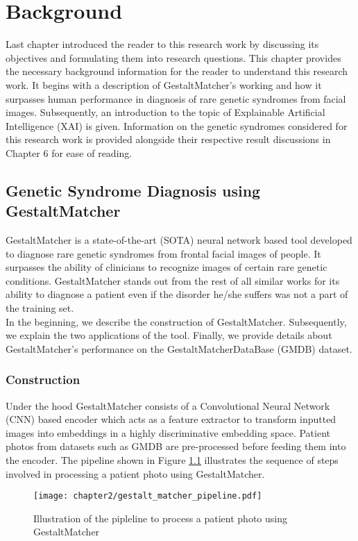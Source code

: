 \documentclass[../report.tex]{subfiles}
\begin{document}
    \chapter{Background}\label{chap_background}
	Last chapter introduced the reader to this research work by discussing its objectives and formulating them into research questions. This chapter provides the necessary background information for the reader to understand this research work. It begins with a description of GestaltMatcher's working and how it surpasses human performance in diagnosis of rare genetic syndromes from facial images. Subsequently, an introduction to the topic of Explainable Artificial Intelligence (XAI) is given. Information on the genetic syndromes considered for this research work is provided alongside their respective result discussions in Chapter 6 for ease of reading. 
    \section{Genetic Syndrome Diagnosis using GestaltMatcher}
    GestaltMatcher is a state-of-the-art (SOTA) neural network based tool developed to diagnose rare genetic syndromes from frontal facial images of people. It surpasses the ability of clinicians to recognize images of certain rare genetic conditions. GestaltMatcher stands out from the rest of all similar works for its ability to diagnose a patient even if the disorder he/she suffers was not a part of the training set.\\ 
    In the beginning, we describe the construction of GestaltMatcher. Subsequently, we explain the two applications of the tool. Finally, we provide details about GestaltMatcher's performance on the GestaltMatcherDataBase (GMDB) dataset.     
    \subsection{Construction}
    Under the hood GestaltMatcher consists of a  Convolutional Neural Network (CNN) based encoder which acts as a feature extractor
    to transform inputted images into embeddings in a highly discriminative embedding space. Patient photos from datasets such as GMDB are pre-processed before feeding them into the encoder.
    The pipeline shown in Figure \ref{fig_gm_pipeline_ch2} illustrates the sequence of steps involved in processing a patient photo using GestaltMatcher.
    \begin{figure}[ht]
    	\hspace*{-0.5cm}      
    	\texttt{[image: chapter2/gestalt\_matcher\_pipeline.pdf]}
    	\caption{Illustration of the pipleline to process a patient photo using GestaltMatcher}
    	\label{fig_gm_pipeline_ch2}
    \end{figure}
    
\end{document}
